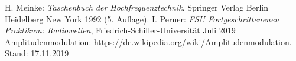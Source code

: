 \documentclass[a4paper,twoside,final]{article}
\begin{document}

\begin{thebibliography}{xxx}
	H. Meinke: \textit{Taschenbuch der Hochfrequenztechnik}. Springer Verlag Berlin Heidelberg New York 1992 (5. Auflage).
  I. Perner: \textit{FSU Fortgeschrittenenen Praktikum: Radiowellen}, Fried\-rich-Schil\-ler-Uni\-versi\-tät Juli 2019
  Amplitudenmodulation: \url{https://de.wikipedia.org/wiki/Amplitudenmodulation}. Stand: 17.11.2019
\end{thebibliography}
\end{document}
